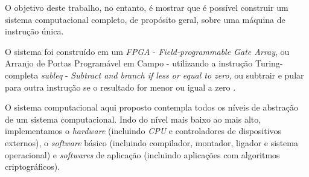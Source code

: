 O objetivo deste trabalho, no entanto, é mostrar que é possível construir um
sistema computacional completo, de propósito geral, sobre uma máquina de
instrução única.

O sistema foi construído em um \textit{FPGA} - \textit{Field-programmable Gate
  Array}, ou Arranjo de Portas Programável em Campo \cite{brant2012zuma} -
utilizando a instrução Turing-completa \textit{subleq} - \textit{Subtract and
  branch if less or equal to zero}, ou subtrair e pular para outra instrução se
o resultado for menor ou igual a zero \cite{subleq}.

O sistema computacional aqui proposto contempla todos os níveis de abstração de
um sistema computacional. Indo do nível mais baixo ao mais alto, implementamos o
\textit{hardware} (incluindo \textit{CPU} e controladores de dispositivos
externos), o \textit{software} básico (incluindo compilador, montador, ligador e
sistema operacional) e \textit{softwares} de aplicação (incluindo aplicações com
algoritmos criptográficos).


